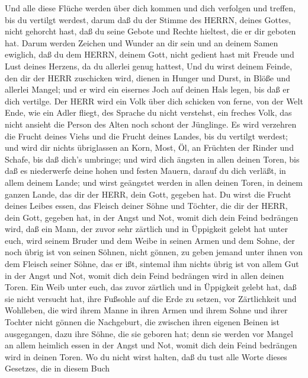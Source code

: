  Und alle diese Flüche werden über dich kommen und dich
verfolgen und treffen, bis du vertilgt werdest, darum daß du der Stimme
des HERRN, deines Gottes, nicht gehorcht hast, daß du seine Gebote und
Rechte hieltest, die er dir geboten hat.  Darum werden
Zeichen und Wunder an dir sein und an deinem Samen ewiglich,
 daß du dem HERRN, deinem Gott, nicht gedient hast mit
Freude und Lust deines Herzens, da du allerlei genug hattest,
 Und du wirst deinem Feinde, den dir der HERR zuschicken
wird, dienen in Hunger und Durst, in Blöße und allerlei Mangel; und er
wird ein eisernes Joch auf deinen Hals legen, bis daß er dich vertilge.
 Der HERR wird ein Volk über dich schicken von ferne, von
der Welt Ende, wie ein Adler fliegt, des Sprache du nicht verstehst,
 ein freches Volk, das nicht ansieht die Person des Alten
noch schont der Jünglinge.  Es wird verzehren die Frucht
deines Viehs und die Frucht deines Landes, bis du vertilgt werdest; und
wird dir nichts übriglassen an Korn, Most, Öl, an Früchten der Rinder
und Schafe, bis daß dich's umbringe;  und wird dich ängsten
in allen deinen Toren, bis daß es niederwerfe deine hohen und festen
Mauern, darauf du dich verläßt, in allem deinem Lande; und wirst
geängstet werden in allen deinen Toren, in deinem ganzen Lande, das dir
der HERR, dein Gott, gegeben hat.  Du wirst die Frucht
deines Leibes essen, das Fleisch deiner Söhne und Töchter, die dir der
HERR, dein Gott, gegeben hat, in der Angst und Not, womit dich dein
Feind bedrängen wird,  daß ein Mann, der zuvor sehr
zärtlich und in Üppigkeit gelebt hat unter euch, wird seinem Bruder und
dem Weibe in seinen Armen und dem Sohne, der noch übrig ist von seinen
Söhnen, nicht gönnen,  zu geben jemand unter ihnen von dem
Fleisch seiner Söhne, das er ißt, sintemal ihm nichts übrig ist von
allem Gut in der Angst und Not, womit dich dein Feind bedrängen wird in
allen deinen Toren.  Ein Weib unter euch, das zuvor
zärtlich und in Üppigkeit gelebt hat, daß sie nicht versucht hat, ihre
Fußsohle auf die Erde zu setzen, vor Zärtlichkeit und Wohlleben, die
wird ihrem Manne in ihren Armen und ihrem Sohne und ihrer Tochter nicht
gönnen  die Nachgeburt, die zwischen ihren eigenen Beinen
ist ausgegangen, dazu ihre Söhne, die sie geboren hat; denn sie werden
vor Mangel an allem heimlich essen in der Angst und Not, womit dich dein
Feind bedrängen wird in deinen Toren.  Wo du nicht wirst
halten, daß du tust alle Worte dieses Gesetzes, die in diesem Buch
